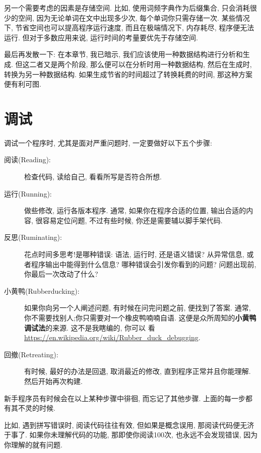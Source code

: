 \documentclass[10pt]{book}
\begin{document}
另一个需要考虑的因素是存储空间. 
比如, 使用词频字典作为后缀集合, 只会消耗很少的空间, 
因为无论单词在文中出现多少次, 每个单词你只需存储一次. 
某些情况下, 节省空间也可以提高程序运行速度, 而且在极端情况下, 
内存耗尽, 程序便无法运行. 但对于多数应用来说, 运行时间的考量要优先于存储空间. 

最后再发散一下: 在本章节, 我已暗示, 我们应该使用一种数据结构进行分析和生成. 
但这二者又是两个阶段, 那么便可以在分析时用一种数据结构, 然后在生成时, 
转换为另一种数据结构. 如果生成节省的时间超过了转换耗费的时间, 
那这种方案便有利可图. 


\section{调试}

调试一个程序时, 尤其是面对严重问题时, 一定要做好以下五个步骤:

\begin{description}

\item[阅读(Reading):] 检查代码, 读给自己, 看看所写是否符合所想. 

\item[运行(Running):] 做些修改, 运行各版本程序. 通常, 如果你在程序合适的位置, 
输出合适的内容, 很容易定位问题, 不过有些时候, 你还是需要辅以脚手架代码. 

\item[反思(Ruminating):] 花点时间多思考!是哪种错误: 语法, 运行时, 还是语义错误? 
从异常信息, 或者程序输出中能得到什么信息? 哪种错误会引发你看到的问题? 
问题出现前, 你最后一次改动了什么? 

\item[小黄鸭(Rubberducking):] 如果你向另一个人阐述问题, 有时候在问完问题之前, 
便找到了答案. 
通常, 你不需要找别人;你只需要对一个橡皮鸭喃喃自语. 
这便是众所周知的{\bf 小黄鸭调试法}的来源. 这不是我瞎编的, 你可以
看\url{https://en.wikipedia.org/wiki/Rubber_duck_debugging}.

\item[回撤(Retreating):] 有时候, 最好的办法是回退, 
取消最近的修改, 直到程序正常并且你能理解. 然后开始再次构建. 

\end{description}

新手程序员有时候会在以上某种步骤中徘徊, 而忘记了其他步骤. 
上面的每一步都有其不灵的时候. 

比如, 遇到拼写错误时, 阅读代码往往有效, 但如果是概念误用, 那阅读代码便无济于事了. 
如果你未理解代码的功能, 那即使你阅读100次, 也永远不会发现错误, 
因为你理解的就有问题. 
\end{document}
